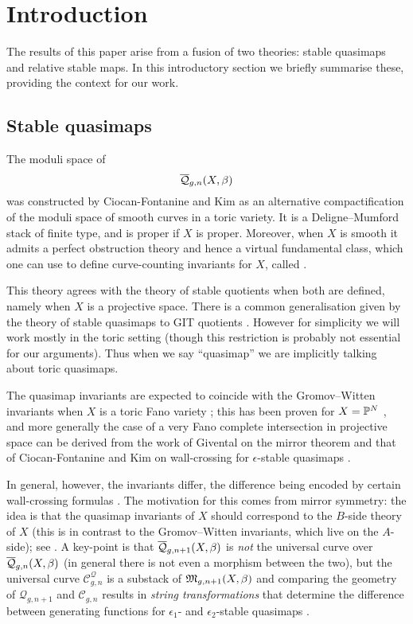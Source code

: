 \section{Introduction}
The results of this paper arise from a fusion of two theories: stable quasimaps and relative stable maps. In this introductory section we briefly summarise these, providing the context for our work.

\subsection{Stable quasimaps}
The moduli space of 
\begin{equation*} \overline{\mathcal Q}_{g,n}(X,\beta) \end{equation*}
was constructed by Ciocan-Fontanine and Kim \cite{CF-K} as an alternative compactification of the moduli space of smooth curves in a toric variety. It is a Deligne--Mumford stack of finite type, and is proper if $X$ is proper. Moreover, when $X$ is smooth it admits a perfect obstruction theory and hence a virtual fundamental class, which one can use to define curve-counting invariants for $X$, called .

This theory agrees with the theory of stable quotients \cite{MOP} when both are defined, namely when $X$ is a projective space.  There is a common generalisation given by the theory of stable quasimaps to GIT quotients \cite{CFKM}. However for simplicity we will work mostly in the toric setting (though this restriction is probably not essential for our arguments). Thus when we say ``quasimap'' we are implicitly talking about toric quasimaps.

The quasimap invariants are expected to coincide with the Gromov--Witten invariants when $X$ is a toric Fano variety \cite{CM}; this has been proven for $X=\mathbb P^N$ \cite{MOP} \cite[\S 5.4]{Manolache-Push}, and more generally the case of a very Fano complete intersection in projective space can be derived from the work of Givental on the mirror theorem \cite[Theorem 0.1]{Givental-mirror} and that of Ciocan-Fontanine and Kim on wall-crossing for $\epsilon$-stable quasimaps \cite[Conjecture 7.2.10]{CF-K}\cite[\S 5.5 and Conjecture 6.3.1]{CF-K-wallcrossing}.

In general, however, the invariants differ, the difference being encoded by certain wall-crossing formulas \cite{CF-K-wallcrossing}. The motivation for this comes from mirror symmetry: the idea is that the quasimap invariants of $X$ should correspond to the $B$-side theory of $X$ (this is in contrast to the Gromov--Witten invariants, which live on the $A$-side); see \cite[\S 7]{CF-K}.  A key-point is that $\overline{\mathcal Q}_{g,n+1}(X,\beta)$ is \emph{not} the universal curve over $\overline{\mathcal Q}_{g,n}(X,\beta)$ (in general there is not even a morphism between the two), but the universal curve $\mathcal C_{g,n}^\mathcal{Q}$ is a substack of $\mathfrak M_{g,n+1}(X,\beta)$ and comparing the geometry of $\mathcal Q_{g,n+1}$ and $\mathcal C_{g,n}$ results in \emph{string transformations} that determine the difference between generating functions for $\epsilon_1$- and $\epsilon_2$-stable quasimaps \cite[\S 6 and 7]{CF-K-wallcrossing}.

